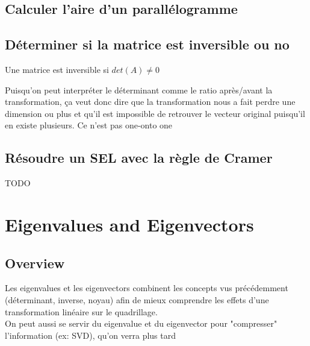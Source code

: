 \documentclass{article}
\begin{document}
\subsection{Calculer l'aire d'un parallélogramme}

\subsection{Déterminer si la matrice est inversible ou no}

\begin{theorem}
    Une matrice est inversible si $det(A) \neq 0$
\end{theorem}

\begin{intuition}
    Puisqu'on peut interpréter le déterminant comme le ratio après/avant la
    transformation, ça veut donc dire que la transformation nous a fait
    perdre une dimension ou plus et qu'il est impossible de retrouver
    le vecteur original puisqu'il en existe plusieurs. Ce n'est pas one-onto
    one
\end{intuition}

\subsection{Résoudre un SEL avec la règle de Cramer}

\begin{remark}
    TODO
\end{remark}

\section{Eigenvalues and Eigenvectors}

\subsection{Overview}%
\label{sub:Overview}

Les eigenvalues et les eigenvectors combinent les concepts vus précédemment
(déterminant, inverse, noyau) afin de mieux comprendre les effets d'une
transformation linéaire sur le quadrillage.\\

On peut aussi se servir du eigenvalue et du eigenvector pour "compresser"
l'information (ex: SVD), qu'on verra plus tard
\end{document}
